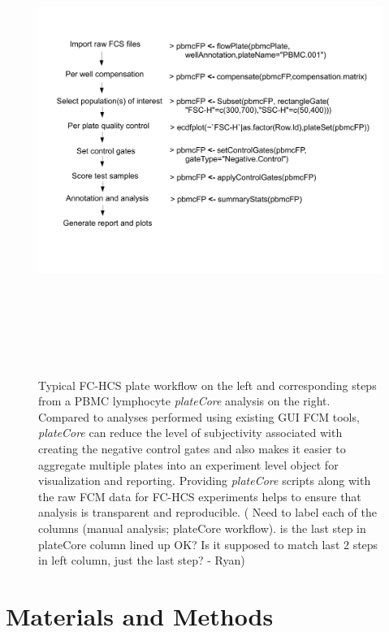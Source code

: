 \documentclass[12pt]{article}
\newcommand{\Rpackage}[1]{{\textit{#1}}}
\begin{document}
\begin{figure}
\centering
\includegraphics[width=7in,height=6in]{analysisSteps.pdf}
\caption{Typical FC-HCS plate workflow on the left and corresponding steps from
a PBMC lymphocyte \Rpackage{plateCore} analysis on the right. Compared to
analyses performed using existing GUI FCM tools, \Rpackage{plateCore} can
reduce the level of subjectivity associated with creating the negative control
gates and also makes it easier to aggregate multiple plates into an experiment
level object for visualization and reporting. Providing \Rpackage{plateCore}
scripts along with the raw FCM data for FC-HCS experiments helps to ensure that
analysis is transparent and reproducible. ( Need to label each of the columns
(manual analysis; plateCore workflow). is the last step in plateCore column
lined up OK? Is it supposed to match last 2 steps in left column, just the last
step? - Ryan)}
\label{fig:analysis}
\end{figure}
 
\clearpage
\section*{Materials and Methods}
\end{document}
